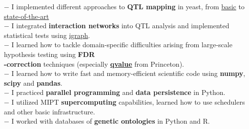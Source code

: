 \documentclass[11pt]{res}
\begin{document}
\begin{resume}
\newpage
$  $\\
$ - $ I implemented different approaches to \textbf{QTL mapping} in yeast, from \href{https://www.ncbi.nlm.nih.gov/pubmed/11923494}{basic} to \href{https://elifesciences.org/articles/35471}{state-of-the-art}\\
$ - $ I integrated \textbf{interaction networks} into QTL analysis and implemented statistical tests using \href{http://igraph.org/redirect.html}{igraph}.\\
$ - $  I learned how to tackle domain-specific difficulties arising from large-scale hypothesis testing using \textbf{FDR\\\hphantom{—} -correction} techniques (especially \href{https://github.com/StoreyLab/qvalue}{\textbf{qvalue}} from Princeton).\\
$ - $ I learned how to write fast and memory-efficient scientific code using \textbf{numpy}, \textbf{scipy} and \textbf{pandas}.\\
$ - $ I practiced \textbf{parallel programming} and \textbf{data persistence} in Python.\\ 
$ - $ I utilized MIPT \textbf{supercomputing} capabilities, learned how to use schedulers and other basic infrastructure.\\
$ - $ I worked with databases of \textbf{genetic ontologies} in Python and R.\vspace{0.2em}


\end{resume}
\end{document}
